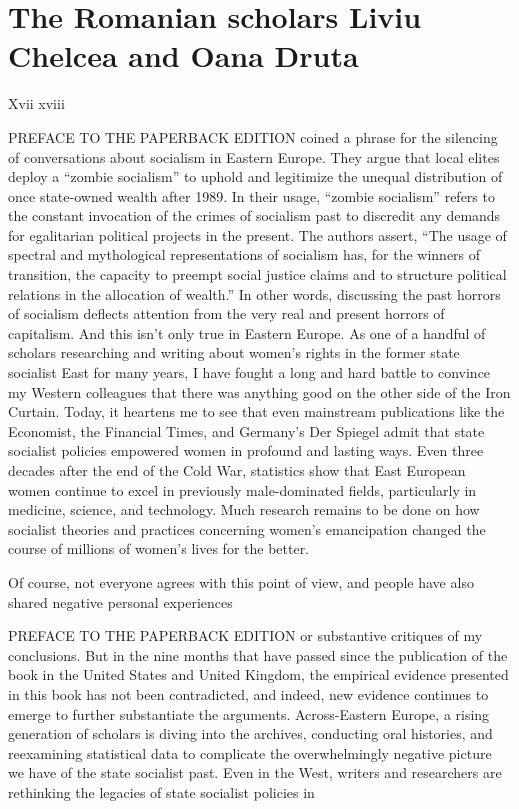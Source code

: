 \section{The Romanian scholars Liviu Chelcea and Oana Druta}
 \par 
Xvii xviii
 \par 
PREFACE TO THE PAPERBACK EDITION coined a phrase for the silencing of conversations about socialism in Eastern Europe. They argue that local elites deploy a “zombie socialism” to uphold and legitimize the unequal distribution of once state-owned wealth after 1989. In their usage, “zombie socialism” refers to the constant invocation of the crimes of socialism past to discredit any demands for egalitarian political projects in the present. The authors assert, “The usage of spectral and mythological representations of socialism has, for the winners of transition, the capacity to preempt social justice claims and to structure political relations in the allocation of wealth.” In other words, discussing the past horrors of socialism deflects attention from the very real and present horrors of capitalism. And this isn’t only true in Eastern Europe. As one of a handful of scholars researching and writing about women’s rights in the former state socialist East for many years, I have fought a long and hard battle to convince my Western colleagues that there was anything good on the other side of the Iron Curtain. Today, it heartens me to see that even mainstream publications like the Economist, the Financial Times, and Germany’s Der Spiegel admit that state socialist policies empowered women in profound and lasting ways. Even three decades after the end of the Cold War, statistics show that East European women continue to excel in previously male-dominated fields, particularly in medicine, science, and technology. Much research remains to be done on how socialist theories and practices concerning women’s emancipation changed the course of millions of women’s lives for the better.
 \par 
Of course, not everyone agrees with this point of view, and people have also shared negative personal experiences
 \par 
PREFACE TO THE PAPERBACK EDITION or substantive critiques of my conclusions. But in the nine months that have passed since the publication of the book in the United States and United Kingdom, the empirical evidence presented in this book has not been contradicted, and indeed, new evidence continues to emerge to further substantiate the arguments. Across-Eastern Europe, a rising generation of scholars is diving into the archives, conducting oral histories, and reexamining statistical data to complicate the overwhelmingly negative picture we have of the state socialist past. Even in the West, writers and researchers are rethinking the legacies of state socialist policies in
